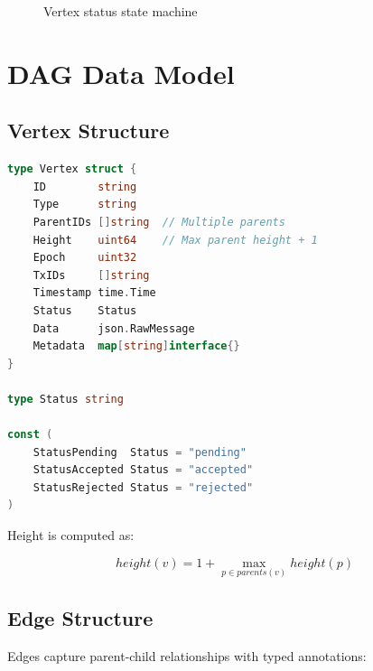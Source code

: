 \documentclass[11pt,twocolumn]{article}
\begin{document}
\begin{figure}[h]
\centering
{}
\caption{Vertex status state machine}
\label{fig:status-states}
\end{figure}

\section{DAG Data Model}

\subsection{Vertex Structure}

\begin{lstlisting}[language=Go,caption={DAG vertex definition}]
type Vertex struct {
    ID        string
    Type      string
    ParentIDs []string  // Multiple parents
    Height    uint64    // Max parent height + 1
    Epoch     uint32
    TxIDs     []string
    Timestamp time.Time
    Status    Status
    Data      json.RawMessage
    Metadata  map[string]interface{}
}

type Status string

const (
    StatusPending  Status = "pending"
    StatusAccepted Status = "accepted"
    StatusRejected Status = "rejected"
)
\end{lstlisting}

Height is computed as:

\begin{equation}
height(v) = 1 + \max_{p \in parents(v)} height(p)
\end{equation}

\subsection{Edge Structure}

Edges capture parent-child relationships with typed annotations:
\end{document}
